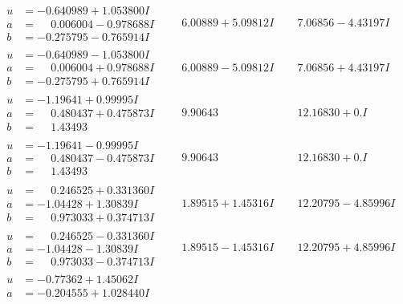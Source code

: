 \documentclass[1p]{elsarticle_modified}
\theoremstyle{definition}
\begin{document}
$$\begin{array}{c|c|c}
\begin{aligned}
u &= -0.640989 + 1.053800 I \\
a &= \phantom{-}0.006004 - 0.978688 I \\
b &= -0.275795 - 0.765914 I\end{aligned}
 & \phantom{-}6.00889 + 5.09812 I & \phantom{-}7.06856 - 4.43197 I \\ \hline\begin{aligned}
u &= -0.640989 - 1.053800 I \\
a &= \phantom{-}0.006004 + 0.978688 I \\
b &= -0.275795 + 0.765914 I\end{aligned}
 & \phantom{-}6.00889 - 5.09812 I & \phantom{-}7.06856 + 4.43197 I \\ \hline\begin{aligned}
u &= -1.19641 + 0.99995 I \\
a &= \phantom{-}0.480437 + 0.475873 I \\
b &= \phantom{-}1.43493\phantom{ +0.000000I}\end{aligned}
 & \phantom{-}9.90643\phantom{ +0.000000I} & \phantom{-}12.16830 + 0. I\phantom{ +0.000000I} \\ \hline\begin{aligned}
u &= -1.19641 - 0.99995 I \\
a &= \phantom{-}0.480437 - 0.475873 I \\
b &= \phantom{-}1.43493\phantom{ +0.000000I}\end{aligned}
 & \phantom{-}9.90643\phantom{ +0.000000I} & \phantom{-}12.16830 + 0. I\phantom{ +0.000000I} \\ \hline\begin{aligned}
u &= \phantom{-}0.246525 + 0.331360 I \\
a &= -1.04428 + 1.30839 I \\
b &= \phantom{-}0.973033 + 0.374713 I\end{aligned}
 & \phantom{-}1.89515 + 1.45316 I & \phantom{-}12.20795 - 4.85996 I \\ \hline\begin{aligned}
u &= \phantom{-}0.246525 - 0.331360 I \\
a &= -1.04428 - 1.30839 I \\
b &= \phantom{-}0.973033 - 0.374713 I\end{aligned}
 & \phantom{-}1.89515 - 1.45316 I & \phantom{-}12.20795 + 4.85996 I \\ \hline\begin{aligned}
u &= -0.77362 + 1.45062 I \\
a &= -0.204555 + 1.028440 I \\

\end{aligned}
\end{array}$$
\end{document}
